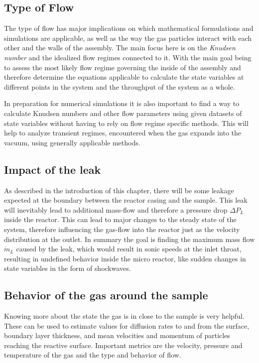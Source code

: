 \subsection{Type of Flow}

	The type of flow has major implications on which mathematical formulations and simulations are applicable, as well as the way the gas particles interact with each other and the walls of the assembly. 
	The main focus here is on the \emph{Knudsen number} and the idealized flow regimes connected to it.
	With the main goal being to assess the most likely flow regime governing the inside of the assembly and therefore determine the equations applicable to calculate the state variables at different points in the system and the throughput of the system as a whole.

	In preparation for numerical simulations it is also important to find a way to calculate Knudsen numbers and other flow parameters using given datasets of state variables without having to rely on flow regime specific methods. This will help to analyze transient regimes, encountered when the gas expands into the vacuum, using generally applicable methods.

\subsection{Impact of the leak}

	As described in the introduction of this chapter, there will be some leakage expected at the boundary between the reactor casing and the sample.
	This leak will inevitably lead to additional mass-flow and therefore a pressure drop $\Delta P_L$ inside the reactor.
	This can lead to major changes to the steady state of the system, therefore influencing the gas-flow into the reactor just as the velocity distribution at the outlet.
	In summary the goal is finding the maximum mass flow $\dot{m}_L$ caused by the leak, which would result in sonic speeds at the inlet throat, resulting in undefined behavior inside the micro reactor, like sudden changes in state variables in the form of shockwaves. 

\subsection{Behavior of the gas around the sample}

	Knowing more about the state the gas is in close to the sample is very helpful.
	These can be used to estimate values for diffusion rates to and from the surface, boundary layer thickness, and mean velocities and momentum of particles reaching the reactive surface. 
	Important metrics are the velocity, pressure and temperature of the gas and the type and behavior of flow.

